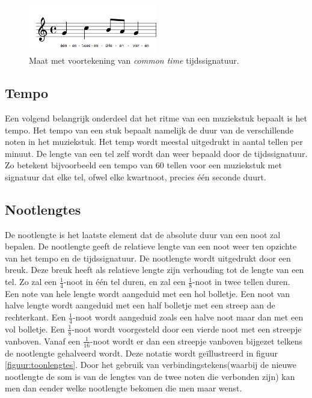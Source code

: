\begin{figure}[!ht]
  \centering
  \includegraphics[width=0.5\textwidth]{1_Muzikale_Achtergrond/tijdssignatuur}
  \caption{Maat met voortekening van \textit{common time} tijdssignatuur.}
  \label{figuur:tijdssignatuur}
\end{figure}

\subsection{Tempo}
Een volgend belangrijk onderdeel dat het ritme van een muziekstuk bepaalt is het tempo. Het tempo van een stuk bepaalt namelijk de duur van de verschillende noten in het muziekstuk. Het temp wordt meestal uitgedrukt in aantal tellen per minuut. De lengte van een tel zelf wordt dan weer bepaald door de tijdssignatuur. Zo betekent bijvoorbeeld een tempo van 60 tellen voor een muziekstuk met signatuur  dat elke tel, ofwel elke kwartnoot, precies \'e\'en seconde duurt. 

\subsection{Nootlengtes}
De nootlengte is het laatste element dat de absolute duur van een noot zal bepalen. De nootlengte geeft de relatieve lengte van een noot weer ten opzichte van het tempo en de tijdssignatuur. De nootlengte wordt uitgedrukt door een breuk. Deze breuk heeft als relatieve lengte zijn verhouding tot de lengte van een tel. Zo zal een $\frac{1}{4}$-noot in  \'e\'en tel duren, en zal een $\frac{1}{8}$-noot in  twee tellen duren.\\
Een note van hele lengte wordt aangeduid met een hol bolletje. Een noot van halve lengte wordt aangeduid met een half bolletje met een streep aan de rechterkant. Een $\frac{1}{4}$-noot wordt aangeduid zoals een halve noot maar dan met een vol bolletje. Een $\frac{1}{8}$-noot wordt voorgesteld door een vierde noot met een streepje vanboven. Vanaf een $\frac{1}{16}$-noot wordt er dan een streepje vanboven bijgezet telkens de nootlengte gehalveerd wordt. Deze notatie wordt ge\"illustreerd in figuur \ref{figuur:toonlengtes}. Door het gebruik van verbindingstekens(waarbij de nieuwe nootlengte de som is van de lengtes van de twee noten die verbonden zijn) kan men dan eender welke nootlengte bekomen die men maar wenst. 

